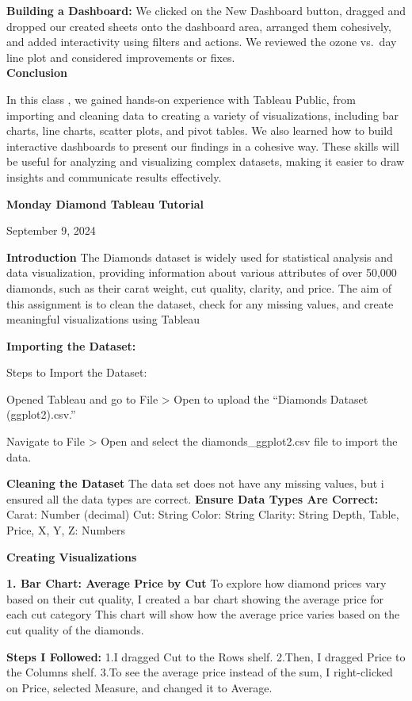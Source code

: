 \documentclass[
  letterpaper,
  DIV=11,
  numbers=noendperiod]{scrreprt}
\begin{document}
\textbf{Building a Dashboard:} We clicked on the New Dashboard button,
dragged and dropped our created sheets onto the dashboard area, arranged
them cohesively, and added interactivity using filters and actions. We
reviewed the ozone vs.~day line plot and considered improvements or
fixes.\\

\textbf{Conclusion}

In this class , we gained hands-on experience with Tableau Public, from
importing and cleaning data to creating a variety of visualizations,
including bar charts, line charts, scatter plots, and pivot tables. We
also learned how to build interactive dashboards to present our findings
in a cohesive way. These skills will be useful for analyzing and
visualizing complex datasets, making it easier to draw insights and
communicate results effectively.

\textbf{Monday Diamond Tableau Tutorial}

September 9, 2024

\textbf{Introduction} The Diamonds dataset is widely used for
statistical analysis and data visualization, providing information about
various attributes of over 50,000 diamonds, such as their carat weight,
cut quality, clarity, and price. The aim of this assignment is to clean
the dataset, check for any missing values, and create meaningful
visualizations using Tableau

\textbf{Importing the Dataset:}

Steps to Import the Dataset:

Opened Tableau and go to File \textgreater{} Open to upload the
``Diamonds Dataset (ggplot2).csv.''

Navigate to File \textgreater{} Open and select the
diamonds\_ggplot2.csv file to import the data.

\textbf{Cleaning the Dataset} The data set does not have any missing
values, but i ensured all the data types are correct. \textbf{Ensure
Data Types Are Correct:} Carat: Number (decimal) Cut: String Color:
String Clarity: String Depth, Table, Price, X, Y, Z: Numbers

\textbf{Creating Visualizations}

\textbf{1. Bar Chart: Average Price by Cut} To explore how diamond
prices vary based on their cut quality, I created a bar chart showing
the average price for each cut category This chart will show how the
average price varies based on the cut quality of the diamonds.

\textbf{Steps I Followed:} 1.I dragged Cut to the Rows shelf. 2.Then, I
dragged Price to the Columns shelf. 3.To see the average price instead
of the sum, I right-clicked on Price, selected Measure, and changed it
to Average.
\end{document}
